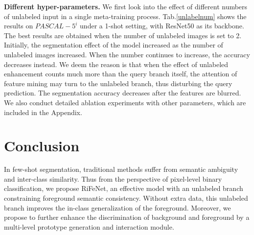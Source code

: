 \documentclass[letterpaper]{article} %
\begin{document}
\begin{table}[!t]
\centering
\begin{threeparttable}
\end{threeparttable}
\caption{Ablation studies of different numbers of unlabeled images in the single meta-training process.}
\label{unlabelnum}
\end{table}

\textbf{Different hyper-parameters.} We first look into the effect of different numbers of unlabeled input in a single meta-training process. Tab.\ref{unlabelnum} shows the results on $PASCAL-5^i$ under a 1-shot setting, with ResNet50 as its backbone. The best results are obtained when the number of unlabeled images is set to 2. Initially, the segmentation effect of the model increased as the number of unlabeled images increased. When the number continues to increase, the accuracy decreases instead. We deem the reason is that when the effect of unlabeled enhancement counts much more than the query branch itself, the attention of feature mining may turn to the unlabeled branch, thus disturbing the query prediction. The segmentation accuracy decreases after the features are blurred. We also conduct detailed ablation experiments with other parameters, which are included in the Appendix.


\section{Conclusion}
In few-shot segmentation, traditional methods suffer from semantic ambiguity and inter-class similarity. Thus from the perspective of pixel-level binary classification, we propose RiFeNet, an effective model with an unlabeled branch constraining foreground semantic consistency. Without extra data, this unlabeled branch improves the in-class generalization of the foreground. Moreover, we propose to further enhance the discrimination of background and foreground by a multi-level prototype generation and interaction module.
\end{document}
